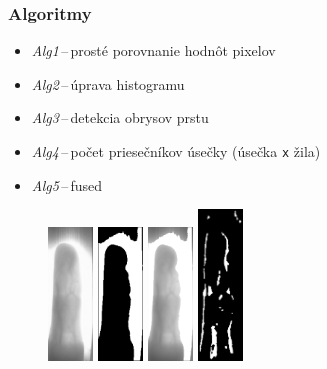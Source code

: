 \documentclass[compress]{beamer}
\begin{document}
\begin{frame}
  \frametitle{Algoritmy}
  \begin{itemize}
    \item \emph{Alg1}\,--\,prosté porovnanie hodnôt pixelov
    \item \emph{Alg2}\,--\,úprava histogramu
    \item \emph{Alg3}\,--\,detekcia obrysov prstu
    \item \emph{Alg4}\,--\,počet priesečníkov úsečky (úsečka \texttt{x} žila)
    \item \emph{Alg5}\,--\,fused
  \end{itemize}

\begin{figure}[ht!]
	\centering
	\includegraphics[width=1.2cm]{../fig/F_08_puvodni.eps}
	\includegraphics[width=1.2cm]{../fig/F_08_maska.eps}
	\includegraphics[width=1.2cm]{../fig/F_08_aplikovana_maska.eps}
	\includegraphics[width=1.2cm]{../fig/F_08_extrakce.eps}
\end{figure}
\end{frame}
\end{document}
